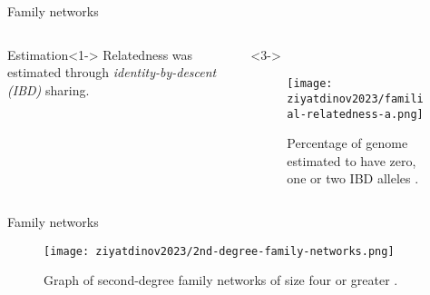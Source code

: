 \begin{frame}{Family networks}

\begin{columns}
    \begin{column}{0.45\textwidth} 

       \begin{exampleblock}{Estimation}<1->
            Relatedness was estimated through \textit{identity-by-descent (IBD)} sharing.
       \end{exampleblock}

       \medskip
    

    \end{column}
    \begin{column}{0.45\textwidth}<3->
        \begin{figure}[htpb]
        \centering
        \texttt{[image: ziyatdinov2023/familial-relatedness-a.png]}
        \caption{Percentage of genome estimated to have zero, one or two IBD alleles \parencite{ziyatdinov2023}.}
        \label{fig:ibd-genome-percentage}
        \end{figure}
    \end{column}
\end{columns}
\end{frame}

\begin{frame}[t]{Family networks}
    \begin{figure}[htpb]
        \centering
        \texttt{[image: ziyatdinov2023/2nd-degree-family-networks.png]}
        \caption{Graph of second-degree family networks of size four or greater \parencite{ziyatdinov2023}.}
        \label{fig:2nd-degree-megaplot}
    \end{figure}
\end{frame}

